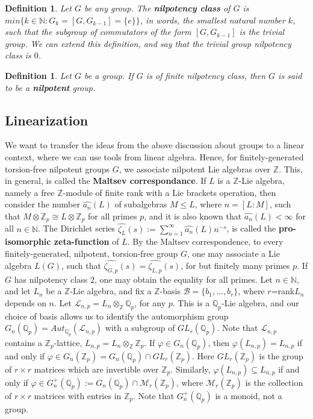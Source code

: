 \documentclass[12pt]{article}
\newtheorem{definition}[theorem]{Definition}
\begin{document}
\begin{definition}
\label{def.nilpotency.class}
Let $G$ be any group. The \textbf{nilpotency class} of $G$ is $min\{k\in\mathbb{N} : G_k=[G,G_{k-1}]=\{e\}\}$, in words, the smallest natural number $k$, such that the subgroup of commutators of the form $[G,G_{k-1}]$ is the trivial group. We can extend this definition, and say that the trivial group nilpotency class is $0$.
\end{definition}
\begin{definition}
\label{def.nilpotent.group}
Let $G$ be a group. If $G$ is of finite nilpotency class, then $G$ is said to be a \textbf{nilpotent} group.
\end{definition}
\subsection{Linearization}
We want to transfer the ideas from the above discussion about groups to a linear context, where we can use tools from linear algebra.
Hence, for finitely-generated torsion-free nilpotent groups $G$, we associate nilpotent Lie algebras over $\mathbb{Z}$. This, in general, is called the \textbf{Maltsev correspondance}. 
If $L$ is a $\mathbb{Z}$-Lie algebra, namely a free $\mathbb{Z}$-module of finite rank with a Lie brackets operation, then consider the number $\hat{a_n}(L)$ of subalgebras $M\leq L$, where $n=[L:M]$, such that $M\otimes\mathbb{Z}_p\cong L\otimes\mathbb{Z}_p$ for all primes $p$, and it is also known that $\hat{a_n}(L)<\infty$ for all $n\in\mathbb{N}$. The Dirichlet series $\hat{\zeta_L}(s):=\sum_{n=1}^{\infty}\hat{a_n}(L)n^{-s}$, is called the \textbf{pro-isomorphic zeta-function} of $L$. By the Maltsev correspondence, to every finitely-generated, nilpotent, torsion-free group $G$, one may associate a Lie algebra $L(G)$, such that $\hat{\zeta_{G,p}}(s)=\hat{\zeta_{L,p}}(s)$, for but finitely many primes $p$. If $G$ has nilpotency class $2$, one may obtain the equality for all primes. Let $n\in\mathbb{N}$, and let $L_n$ be a $\mathbb{Z}$-Lie algebra, and fix a $\mathbb{Z}$-basis $\mathcal{B}=\{b_1,\dots,b_r\}$, where $r$=rank$L_n$ depends on $n$. Let $\mathcal{L}_{n,p}=L_n\otimes_{\mathbb{Z}}\mathbb{Q}_p$, for any $p$. This is a $\mathbb{Q}_p$-Lie algebra, and our choice of basis allows us to identify the automorphism group $G_n(\mathbb{Q}_p)=Aut_{\mathbb{Q}_p}(\mathcal{L}_{n,p})$ with a subgroup of $GL_r(\mathbb{Q}_p)$. Note that $\mathcal{L}_{n,p}$ contains a $\mathbb{Z}_p$-lattice, $L_{n,p}=L_n\otimes_{\mathbb{Z}}\mathbb{Z}_p$. If $\varphi\in G_n(\mathbb{Q}_p)$, then $\varphi(L_{n,p})=L_{n,p}$ if and only if $\varphi\in G_n(\mathbb{Z}_p)=G_n(\mathbb{Q}_p)\cap GL_r(\mathbb{Z}_p)$. Here $GL_r(\mathbb{Z}_p)$ is the group of $r\times r$ matrices which are invertible over $\mathbb{Z}_p$. Similarly, $\varphi(L_{n,p})\subseteq L_{n,p}$ if and only if $\varphi\in G^+_n(\mathbb{Q}_p):=G_n(\mathbb{Q}_p)\cap \mathcal{M}_r(\mathbb{Z}_p)$, where $\mathcal{M}_r(\mathbb{Z}_p)$ is the collection of $r\times r$ matrices with entries in $\mathbb{Z}_p$. Note that $G^+_n(\mathbb{Q}_p)$ is a monoid, not a group.\par
\end{document}

